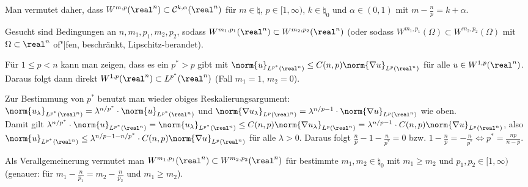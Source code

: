 \begin{Bem}
    Man vermutet daher, dass
    $W^{m,p}(\real^n) \subset \C^{k,\alpha}(\real^n)$
    für $m \in \natural$, $p \in [1, \infty)$, $k \in \natural_0$ und $\alpha \in (0, 1)$
    mit $m - \frac{n}{p} = k + \alpha$.
\end{Bem}

\linie
\pagebreak

\begin{Bem}
    Gesucht sind Bedingungen an $n, m_1, p_1, m_2, p_2$, sodass
    $W^{m_1,p_1}(\real^n) \subset W^{m_2,p_2}(\real^n)$
    (oder sodass $W^{m_1,p_1}(\Omega) \subset W^{m_2,p_2}(\Omega)$
    mit $\Omega \subset \real^n$ of"|fen, beschränkt, Lipschitz-berandet).
    
    Für $1 \le p < n$ kann man zeigen, dass es ein $p^\ast > p$ gibt mit
    $\norm{u}_{L^{p^\ast}(\real^n)} \le C(n,p) \norm{\nabla u}_{L^p(\real^n)}$
    für alle $u \in W^{1,p}(\real^n)$.
    Daraus folgt dann direkt $W^{1,p}(\real^n) \subset L^{p^\ast}(\real^n)$
    (Fall $m_1 = 1$, $m_2 = 0$).
    
    Zur Bestimmung von $p^\ast$ benutzt man wieder obiges Reskalierungsargument:\\
    $\norm{u_\lambda}_{L^{p^\ast}(\real^n)} =
    \lambda^{n/p^\ast} \cdot \norm{u}_{L^{p^\ast}(\real^n)}$
    und $\norm{\nabla u_\lambda}_{L^p(\real^n)} =
    \lambda^{n/p-1} \cdot \norm{\nabla u}_{L^p(\real^n)}$ wie oben.\\
    Damit gilt $\lambda^{n/p^\ast} \cdot \norm{u}_{L^{p^\ast}(\real^n)} =
    \norm{u_\lambda}_{L^{p^\ast}(\real^n)}
    \le C(n,p) \norm{\nabla u_\lambda}_{L^p(\real^n)} =
    \lambda^{n/p-1} \cdot C(n,p) \norm{\nabla u}_{L^p(\real^n)}$,
    also $\norm{u}_{L^{p^\ast}(\real^n)} \le
    \lambda^{n/p-1-n/p^\ast} \cdot C(n,p) \norm{\nabla u}_{L^p(\real^n)}$
    für alle $\lambda > 0$.
    Daraus folgt $\frac{n}{p} - 1 - \frac{n}{p^\ast} = 0$ bzw.
    $1 - \frac{n}{p} = -\frac{n}{p^\ast} \iff p^\ast = \frac{np}{n - p}$.
    
    Als Verallgemeinerung vermutet man $W^{m_1,p_1}(\real^n) \subset W^{m_2,p_2}(\real^n)$ für
    bestimmte $m_1, m_2 \in \natural_0$ mit $m_1 \ge m_2$ und $p_1, p_2 \in [1, \infty)$
    (genauer: für $m_1 - \frac{n}{p_1} = m_2 - \frac{n}{p_2}$ und $m_1 \ge m_2$).
\end{Bem}

\linie


